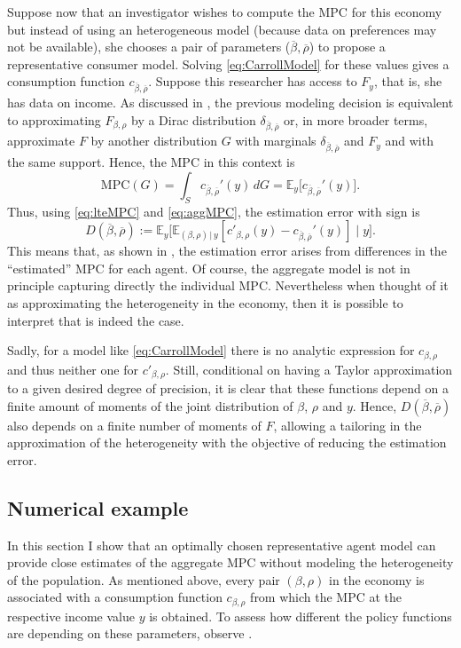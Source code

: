 \documentclass[english, a4paper, 12pt]{article}
\begin{document}
Suppose now that an investigator wishes to compute the MPC for this economy but instead of using an heterogeneous model (because data on preferences may not be available), she chooses a pair of parameters ($\overline{\beta}, \overline{\rho}$) to propose a representative consumer model. Solving \eqref{eq:CarrollModel} for these values gives a consumption function $c_{\overline{\beta}, \overline{\rho}}$. Suppose this researcher has access to $F_{y}$, that is, she has data on income. As discussed in , the previous modeling decision is equivalent to approximating $F_{\beta,\rho}$ by a Dirac distribution $\delta_{\overline{\beta},\overline{\rho}}$ or, in more broader terms, approximate $F$ by another distribution $G$ with marginals $\delta_{\overline{\beta},\overline{\rho}}$ and $F_{y}$ and with the same support. Hence, the MPC in this context is
	\begin{equation} \label{eq:aggMPC}
		\mathrm{MPC}(G) 
			= \int_{S} c_{\overline{\beta},\overline{\rho}}'(y) \, dG 
			= \mathbb{E}_{y}\Big[ c_{\overline{\beta},\overline{\rho}}'(y) \Big].
	\end{equation}	
Thus, using \eqref{eq:lteMPC} and \eqref{eq:aggMPC}, the estimation error with sign is
	$$D(\overline{\beta}, \overline{\rho})
		:=	\mathbb{E}_{y}\Big[ \mathbb{E}_{(\beta,\rho) \, | \, y}[c'_{\beta,\rho}(y) -  c_{\overline{\beta},\overline{\rho}}'(y) ] \; \Big| \; y \Big].$$
This means that, as shown in , the estimation error arises from differences in the ``estimated'' MPC for each agent. Of course, the aggregate model is not in principle capturing directly the individual MPC. Nevertheless when thought of it as approximating the heterogeneity in the economy, then it is possible to interpret that is indeed the case.

Sadly, for a model like \eqref{eq:CarrollModel} there is no analytic expression for $c_{\beta,\rho}$ and thus neither one for $c'_{\beta,\rho}$. Still, conditional on having a Taylor approximation to a given desired degree of precision, it is clear that these functions depend on a finite amount of moments of the joint distribution of $\beta$, $\rho$ and $y$. Hence, $D(\overline{\beta}, \overline{\rho})$ also depends on a finite number of moments of $F$, allowing a tailoring in the approximation of the heterogeneity with the objective of reducing the estimation error.

\subsection{Numerical example}
In this section I show that an optimally chosen representative agent model can provide close estimates of the aggregate MPC without modeling the heterogeneity of the population. As mentioned above, every pair $(\beta,\rho)$ in the economy is associated with a consumption function $c_{\beta,\rho}$ from which the MPC at the respective income value $y$ is obtained. To assess how different the policy functions are depending on these parameters, observe . 
\end{document}
